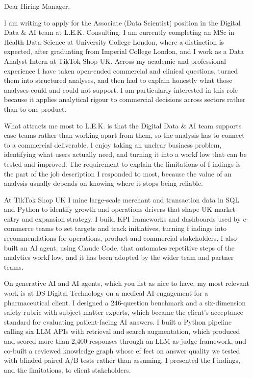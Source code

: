 \documentclass[letterpaper,11pt]{article}
\begin{document}
Dear Hiring Manager,

I am writing to apply for the Associate (Data Scientist) position in the Digital Data \& AI team at L.E.K. Consulting. I am currently completing an MSc in Health Data Science at University College London, where a distinction is expected, after graduating from Imperial College London, and I work as a Data Analyst Intern at TikTok Shop UK. Across my academic and professional experience I have taken open-ended commercial and clinical questions, turned them into structured analyses, and then had to explain honestly what those analyses could and could not support. I am particularly interested in this role because it applies analytical rigour to commercial decisions across sectors rather than to one product.

What attracts me most to L.E.K. is that the Digital Data \& AI team supports case teams rather than working apart from them, so the analysis has to connect to a commercial deliverable. I enjoy taking an unclear business problem, identifying what users actually need, and turning it into a workf\kern0pt low that can be tested and improved. The requirement to explain the limitations of f\kern0pt indings is the part of the job description I responded to most, because the value of an analysis usually depends on knowing where it stops being reliable.

At TikTok Shop UK I mine large-scale merchant and transaction data in SQL and Python to identify growth and operations drivers that shape UK market-entry and expansion strategy. I build KPI frameworks and dashboards used by e-commerce teams to set targets and track initiatives, turning f\kern0pt indings into recommendations for operations, product and commercial stakeholders. I also built an AI agent, using Claude Code, that automates repetitive steps of the analytics workf\kern0pt low, and it has been adopted by the wider team and partner teams.

On generative AI and AI agents, which you list as nice to have, my most relevant work is at DS Digital Technology on a medical AI engagement for a pharmaceutical client. I designed a 246-question benchmark and a six-dimension safety rubric with subject-matter experts, which became the client's acceptance standard for evaluating patient-facing AI answers. I built a Python pipeline calling six LLM APIs with retrieval and search augmentation, which produced and scored more than 2,400 responses through an LLM-as-judge framework, and co-built a reviewed knowledge graph whose ef\kern0pt fect on answer quality we tested with blinded paired A/B tests rather than assuming. I presented the f\kern0pt indings, and the limitations, to client stakeholders.
\end{document}
